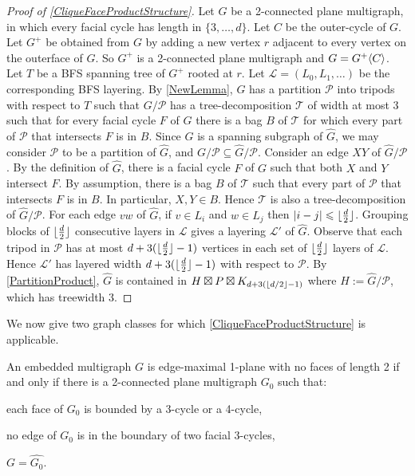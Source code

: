 \documentclass{patmorin}
\DeclarePairedDelimiter{\floor}{\lfloor}{\rfloor}
\DeclarePairedDelimiter{\blah}{\langle}{\rangle}
\newcommand{\TT}{\mathcal{T}}
\newcommand{\PP}{\mathcal{P}}
\renewcommand{\leq}{\leqslant}
\begin{document}
\begin{proof}[Proof of \cref{CliqueFaceProductStructure}]
Let $G$ be a 2-connected plane multigraph, in which every facial cycle has length in $\{3,\dots,d\}$. Let $C$ be the outer-cycle of $G$. Let $G^+$ be obtained from $G$ by adding a new vertex $r$ adjacent to every vertex on the outerface of $G$. So $G^+$ is a 2-connected plane multigraph and $G=G^+\blah{C}$. Let $T$ be a BFS spanning tree of $G^+$ rooted at $r$. Let $\mathcal{L}=(L_0,L_1,\dots)$ be the corresponding BFS layering. By \cref{NewLemma}, $G$ has a partition $\PP$ into tripods with respect to $T$ such that $G / \PP$ has a tree-decomposition $\mathcal{T}$ of width at most 3 such that for every facial cycle $F$ of $G$ there is a bag $B$ of $\mathcal{T}$ for which every part of $\PP$ that intersects $F$ is in $B$. Since $G$ is a spanning subgraph of $\widehat{G}$, we may consider $\PP$ to be a partition of $\widehat{G}$, and $G/\PP \subseteq \widehat{G}/\PP$. Consider an edge $XY$ of $\widehat{G}/\PP$. By the definition of $\widehat{G}$, there is a facial cycle $F$ of $G$ such that both $X$ and $Y$ intersect $F$. By assumption, there is a bag $B$ of $\mathcal{T}$ such that every part of $\PP$ that intersects $F$ is in $B$. In particular, $X,Y\in B$. Hence $\TT$ is also a tree-decomposition of $\widehat{G}/\PP$. For each edge $vw$ of $\widehat{G}$, if $v\in L_i$ and $w\in L_j$ then $|i-j|\leq\floor{\frac{d}{2}}$. Grouping blocks of $\floor{\frac{d}{2}}$ consecutive layers in $\mathcal{L}$ gives a layering $\mathcal{L}'$ of $\widehat{G}$. Observe that each tripod in $\PP$ has at most $d+3( \floor{\frac{d}{2}}-1)$ vertices in each set of $\floor{\frac{d}{2}}$ layers of $\mathcal{L}$. Hence $\mathcal{L}'$ has layered width $d+3( \floor{\frac{d}{2}}-1)$ with respect to $\PP$. By \cref{PartitionProduct}, $\widehat{G}$ is contained in $H \boxtimes P \boxtimes K_{ d + 3( \floor{d/2} -1 )}$ where $H:=\widehat{G}/\PP$, which has treewidth 3.
\end{proof}

We now give two graph classes for which \cref{CliqueFaceProductStructure} is applicable.

\begin{lem}
	An embedded multigraph $G$ is edge-maximal 1-plane with no faces of length 2 if and only if there is a 2-connected plane multigraph $G_0$ such that:
	\begin{compactitem}
		\item each face of $G_0$ is bounded by a 3-cycle or a 4-cycle,
		\item no edge of $G_0$ is in the boundary of two facial 3-cycles,
		\item $G=\widehat{G_0}$.
	\end{compactitem}
\end{lem}
\end{document}
